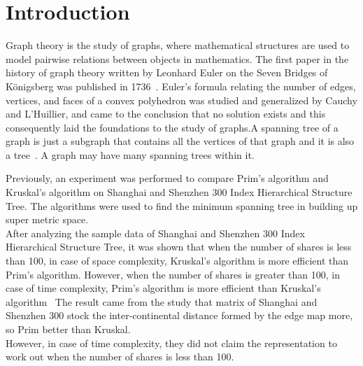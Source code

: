 \documentclass[conference,column]{IEEEtran}
\begin{document}




%
\IEEEpeerreviewmaketitle



\section{Introduction}
Graph theory is the study of graphs, where mathematical structures are used to model pairwise relations between objects in mathematics. The first paper in the history of graph theory written by Leonhard Euler on the Seven Bridges of Königsberg was published in 1736~\cite{graphtheory}. Euler's formula relating the number of edges, vertices, and faces of a convex polyhedron was studied and generalized by Cauchy and L'Huillier, and came to the conclusion that no solution exists and this consequently laid the foundations to the study of graphs.A spanning tree of a graph is just a subgraph that contains all the vertices of that graph and it is also a tree~\cite{minimum}. A graph may have many spanning trees within it.

Previously, an experiment was performed to compare Prim’s algorithm and Kruskal's algorithm on Shanghai and Shenzhen 300 Index Hierarchical Structure Tree. The algorithms were used to find the minimum spanning tree in building up super metric space.\\After analyzing the sample data of Shanghai and Shenzhen 300 Index Hierarchical Structure Tree, it was shown that when the number of shares is less than 100, in case of space complexity, Kruskal’s algorithm is more efficient than Prim’s algorithm. However, when the number of shares is greater than 100, in case of time complexity, Prim’s algorithm is more efficient than Kruskal’s algorithm~\cite{ieee} The result came from the study that matrix of Shanghai and Shenzhen 300 stock the inter-continental distance formed by the edge map more, so Prim better than Kruskal.\\However, in case of time complexity, they did not claim the representation to work out when the number of shares is less than 100.
\end{document}

